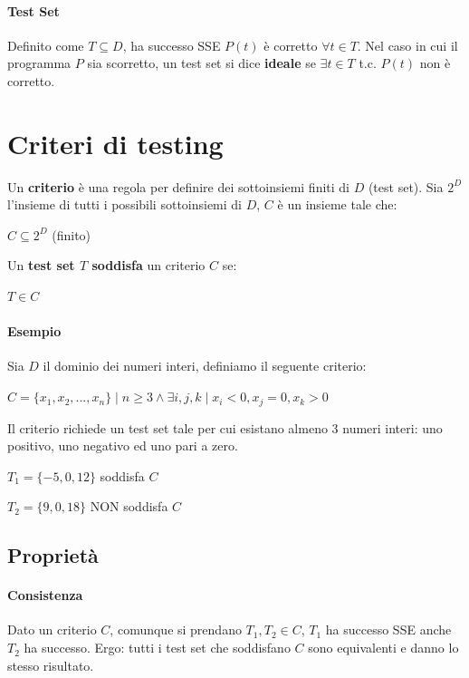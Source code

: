 \paragraph{Test Set} Definito come $T \subseteq D$, ha successo SSE $P(t)$ è corretto $\forall t \in T$. Nel caso in cui il programma $P$ sia scorretto, un test set si dice \textbf{ideale} se $\exists t \in T$ t.c. $P(t)$ non è corretto.

\section{Criteri di testing}

Un \textbf{criterio} è una regola per definire dei sottoinsiemi finiti di $D$ (test set).
Sia $2^D$ l'insieme di tutti i possibili sottoinsiemi di $D$, $C$ è un insieme tale che:
\begin{center}
    $C \subseteq 2^D$ (finito)
\end{center}
Un \textbf{test set $T$ soddisfa} un criterio $C$ se:
\begin{center}
    $T \in C$    
\end{center}

\paragraph{Esempio} Sia $D$ il dominio dei numeri interi, definiamo il seguente criterio:
\begin{center}
    $C = \{x_1, x_2, ..., x_n\} \mid n \ge 3 \land \exists i, j, k \mid x_i < 0, x_j = 0, x_k > 0$    
\end{center}
Il criterio richiede un test set tale per cui esistano almeno 3 numeri interi: uno positivo, uno negativo ed uno pari a zero.
\begin{center}
    $T_1 = \{-5, 0, 12\}$ soddisfa $C$    
\end{center}
\begin{center}
    $T_2 = \{9, 0, 18\}$ NON soddisfa $C$    
\end{center}

\subsection{Proprietà}

\paragraph{Consistenza} Dato un criterio $C$, comunque si prendano $T_1, T_2 \in C$, $T_1$ ha successo SSE anche $T_2$ ha successo. Ergo: tutti i test set che soddisfano $C$ sono equivalenti e danno lo stesso risultato.

